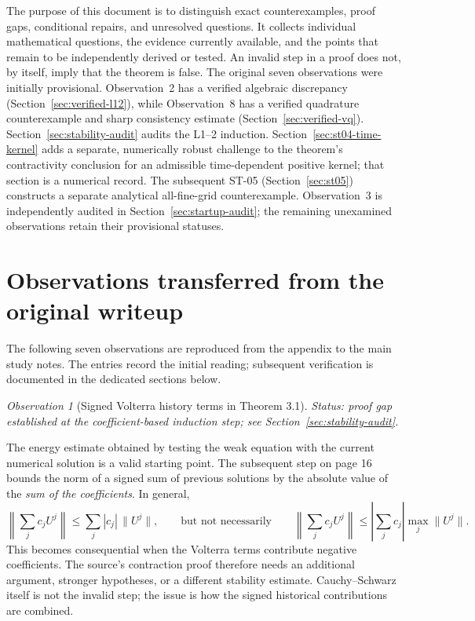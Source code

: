 \documentclass[11pt,a4paper]{amsart}
\theoremstyle{remark}
\newtheorem{observation}{Observation}
\theoremstyle{plain}
\theoremstyle{remark}
\newcommand{\auditstatus}[1]{\par\noindent\emph{#1.}\enspace}
\numberwithin{equation}{section}
\begin{document}
The purpose of this document is to distinguish exact counterexamples, proof gaps, conditional repairs, and unresolved questions. It collects individual mathematical questions, the evidence currently available, and the points that remain to be independently derived or tested. An invalid step in a proof does not, by itself, imply that the theorem is false. The original seven observations were initially provisional. Observation~2 has a verified algebraic discrepancy (Section~\ref{sec:verified-l12}), while Observation~8 has a verified quadrature counterexample and sharp consistency estimate (Section~\ref{sec:verified-vq}). Section~\ref{sec:stability-audit} audits the L1--2 induction. Section~\ref{sec:st04-time-kernel} adds a separate, numerically robust challenge to the theorem's contractivity conclusion for an admissible time-dependent positive kernel; that section is a numerical record. The subsequent ST-05 (Section~\ref{sec:st05}) constructs a separate analytical all-fine-grid counterexample. Observation~3 is independently audited in Section~\ref{sec:startup-audit}; the remaining unexamined observations retain their provisional statuses.

\section{Observations transferred from the original writeup}
\label{sec:original-observations}

The following seven observations are reproduced from the appendix to the main study notes. The entries record the initial reading; subsequent verification is documented in the dedicated sections below.

\begin{observation}[Signed Volterra history terms in Theorem 3.1]
\auditstatus{Status: proof gap established at the coefficient-based induction step; see Section~\ref{sec:stability-audit}}

The energy estimate obtained by testing the weak equation with the current numerical solution is a valid starting point. The subsequent step on page 16 bounds the norm of a signed sum of previous solutions by the absolute value of the \emph{sum of the coefficients}. In general,
\[
\left\|\sum_j c_j U^j\right\|
\leq \sum_j |c_j|\,\|U^j\|,
\qquad\text{but not necessarily}\qquad
\left\|\sum_j c_j U^j\right\|
\leq\left|\sum_jc_j\right|\max_j\|U^j\|.
\]
This becomes consequential when the Volterra terms contribute negative coefficients. The source's contraction proof therefore needs an additional argument, stronger hypotheses, or a different stability estimate. Cauchy--Schwarz itself is not the invalid step; the issue is how the signed historical contributions are combined.
\end{observation}
\end{document}
